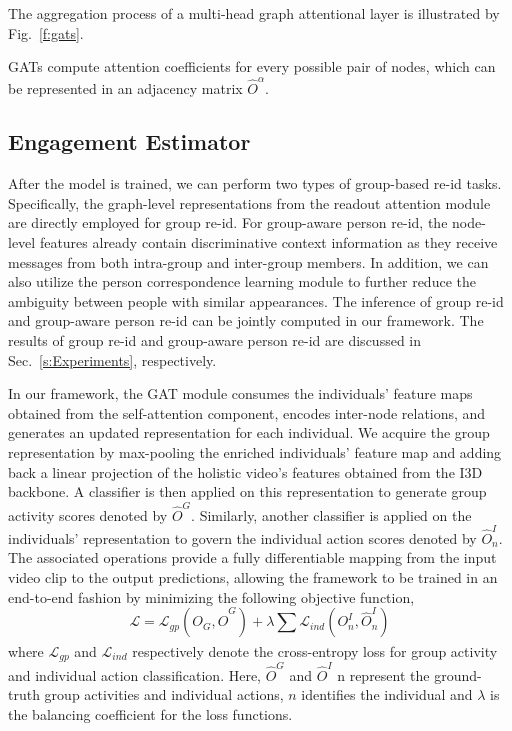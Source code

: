 \documentclass[10pt,journal,compsoc]{IEEEtran}
\begin{document}
The aggregation process of a multi-head graph attentional layer is illustrated by Fig.~\ref{f:gats}.

GATs compute attention coefficients for every possible pair of nodes, which can be represented in an adjacency matrix $\hat{O}^\alpha$.

\subsection{Engagement Estimator}
\label{subs:Engagement_Estimator}

After the model is trained, we can perform two types of group-based re-id tasks. Specifically, the graph-level representations from the readout attention module are directly employed for group re-id. For group-aware person re-id, the node-level features already contain discriminative context information as they receive messages from both intra-group and inter-group members. In addition, we can also utilize the person correspondence learning module to further reduce the ambiguity between people with similar appearances. The inference of group re-id and group-aware person re-id can be jointly computed in our framework. The results of group re-id and group-aware person re-id are discussed in Sec.~\ref{s:Experiments}, respectively.

In our framework, the GAT module consumes the individuals' feature maps obtained from the self-attention component, encodes inter-node relations, and generates an updated representation for each individual. We acquire the group representation by max-pooling the enriched individuals' feature map and adding back a linear projection of the holistic video's features obtained from the I3D backbone. A classifier is then applied on this representation to generate group activity scores denoted by $\hat{O}^G$. Similarly, another classifier is applied on the individuals' representation to govern the individual action scores denoted by $\hat{O}^I_n$. The associated operations provide a fully differentiable mapping from the input video clip to the output predictions, allowing the framework to be trained in an end-to-end fashion by minimizing the following objective function,
\begin{equation}
\mathcal{L} = \mathcal{L}_{gp}(O_G,\hat{O}^G)+\lambda \sum_{} \mathcal{L}_{ind} (O^I_n,\hat{O}^I_n)
\end{equation}
where $\mathcal{L}_{gp}$ and $\mathcal{L}_{ind}$ respectively denote the cross-entropy loss for group activity and individual action classification. Here, $\hat{O}^G$ and $\hat{O}^I$ n represent the ground-truth group activities and individual actions, $n$ identifies the individual and $\lambda$ is the balancing coefficient for the loss functions.
\end{document}
